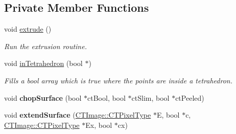\subsection*{Private Member Functions}
\begin{DoxyCompactItemize}
\item 
\hypertarget{classctimage_1_1_volume_corrector_ae1891b19fec618b507d20b5578e75b72}{
void \hyperlink{classctimage_1_1_volume_corrector_ae1891b19fec618b507d20b5578e75b72}{extrude} ()}
\label{classctimage_1_1_volume_corrector_ae1891b19fec618b507d20b5578e75b72}

\begin{DoxyCompactList}\small\item\em Run the extrusion routine. \item\end{DoxyCompactList}\item 
void \hyperlink{classctimage_1_1_volume_corrector_ac596c5e63de666f0c12459f7c473d14e}{inTetrahedron} (bool $\ast$)
\begin{DoxyCompactList}\small\item\em Fills a bool array which is true where the points are inside a tetrahedron. \item\end{DoxyCompactList}\item 
\hypertarget{classctimage_1_1_volume_corrector_a060febb7b26980a6075f37b5c119cd8e}{
void {\bfseries chopSurface} (bool $\ast$ctBool, bool $\ast$ctSlim, bool $\ast$ctPeeled)}
\label{classctimage_1_1_volume_corrector_a060febb7b26980a6075f37b5c119cd8e}

\item 
\hypertarget{classctimage_1_1_volume_corrector_a55b87ef81e929c87b8b0c46e4cc4cc62}{
void {\bfseries extendSurface} (\hyperlink{classctimage_1_1_c_t_image_ab3bf32a276d168a705973d8d6c698cec}{CTImage::CTPixelType} $\ast$E, bool $\ast$c, \hyperlink{classctimage_1_1_c_t_image_ab3bf32a276d168a705973d8d6c698cec}{CTImage::CTPixelType} $\ast$Ex, bool $\ast$cx)}
\label{classctimage_1_1_volume_corrector_a55b87ef81e929c87b8b0c46e4cc4cc62}

\end{DoxyCompactItemize}
